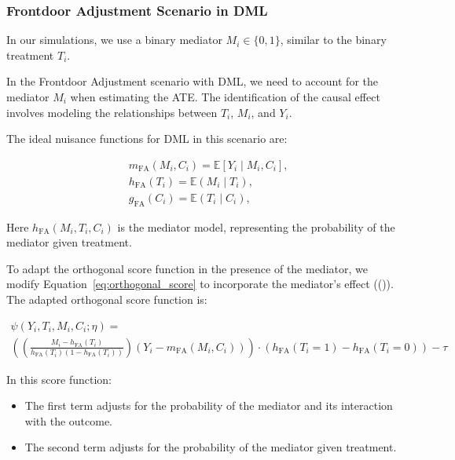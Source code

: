 \documentclass{article}
\numberwithin{equation}{section}
\begin{document}
\subsubsection{Frontdoor Adjustment Scenario in DML}

In our simulations, we use a binary mediator $M_i \in \{0, 1\}$, similar to the binary treatment $T_i$.

In the Frontdoor Adjustment scenario with DML, we need to account for the mediator $M_i$ when estimating the ATE. The identification of the causal effect involves modeling the relationships between $T_i$, $M_i$, and $Y_i$.

The ideal nuisance functions for DML in this scenario are:

\begin{align}
    & m_{\text{FA}}(M_i, C_i) = \mathbb{E}[Y_i \mid M_i, C_i],
    \label{eq:m_x_for_target_frontdoor_adjustment} \\
    & h_{\text{FA}}(T_i) = \mathbb{E}(M_i \mid T_i),
    \label{eq:h_x_for_mediator_frontdoor_adjustment} \\
    & g_{\text{FA}}(C_i) = \mathbb{E}(T_i \mid C_i),
    \label{eq:g_x_for_treatment_frontdoor_adjustment}
\end{align}

Here $h_{\text{FA}}(M_i, T_i, C_i)$ is the mediator model, representing the probability of the mediator given treatment.

To adapt the orthogonal score function in the presence of the mediator, we modify Equation~\eqref{eq:orthogonal_score} to incorporate the mediator's effect ((\cite{ChernozhukovChetverikovDemireretal2018})). The adapted orthogonal score function is:

\begin{equation}
    \begin{split}
        \psi(Y_i, T_i, M_i, C_i; \eta) = \\ \left(
        \left(
            \frac{M_i - h_{\text{FA}}(T_i)}{h_{\text{FA}}(T_i)(1 - h_{\text{FA}}(T_i))}
        \right) (Y_i - m_{\text{FA}}(M_i, C_i))
        \right)
        \cdot \left(
            h_{\text{FA}}(T_i = 1) - h_{\text{FA}}(T_i = 0)
        \right)
        - \tau
    \end{split}
    \label{eq:orthogonal_score_frontdoor}
\end{equation}

In this score function:

\begin{itemize}
    \item The first term adjusts for the probability of the mediator and its interaction with the outcome.
    \item The second term adjusts for the probability of the mediator given treatment.
\end{itemize}
\end{document}
